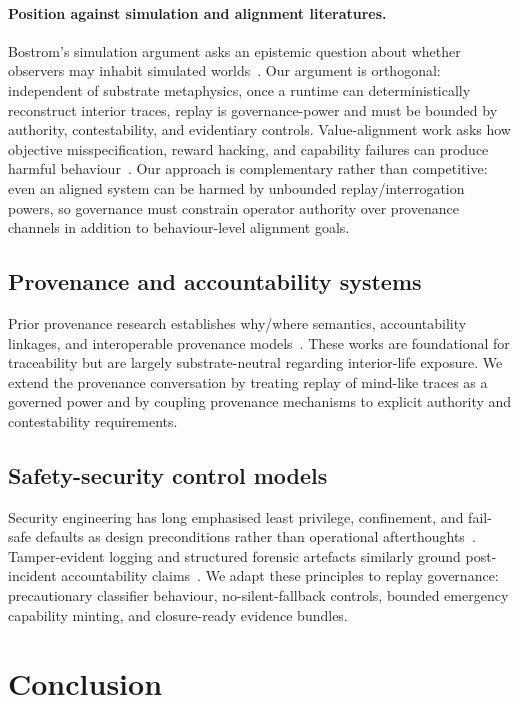 \documentclass[11pt]{article}
\theoremstyle{definition}
\theoremstyle{plain}
\theoremstyle{remark}
\begin{document}
\paragraph{Position against simulation and alignment literatures.}
Bostrom's simulation argument asks an epistemic question about whether observers may inhabit simulated
worlds~\cite{bostrom2003}.  Our argument is orthogonal: independent of substrate metaphysics, once a runtime
can deterministically reconstruct interior traces, replay is governance-power and must be bounded by
authority, contestability, and evidentiary controls.
Value-alignment work asks how objective misspecification, reward hacking, and capability failures can
produce harmful behaviour~\cite{russell2019,amodei2016}.  Our approach is complementary rather than
competitive: even an aligned system can be harmed by unbounded replay/interrogation powers, so governance
must constrain operator authority over provenance channels in addition to behaviour-level alignment goals.

\subsection{Provenance and accountability systems}
Prior provenance research establishes why/where semantics, accountability linkages, and interoperable
provenance models~\cite{buneman2001,moreau2011,w3cprov2013,simmhan2005,weitzner2008}.
These works are foundational for traceability but are largely substrate-neutral regarding interior-life
exposure.
We extend the provenance conversation by treating replay of mind-like traces as a governed power
and by coupling provenance mechanisms to explicit authority and contestability requirements.

\subsection{Safety-security control models}
Security engineering has long emphasised least privilege, confinement, and fail-safe defaults as design
preconditions rather than operational afterthoughts~\cite{saltzer1975,lampson1973}.
Tamper-evident logging and structured forensic artefacts similarly ground post-incident accountability
claims~\cite{schneierkelsey1999,merkle1989}.
We adapt these principles to replay governance: precautionary classifier behaviour, no-silent-fallback
controls, bounded emergency capability minting, and closure-ready evidence bundles.

\section{Conclusion}
\label{sec:conclusion}
\end{document}
